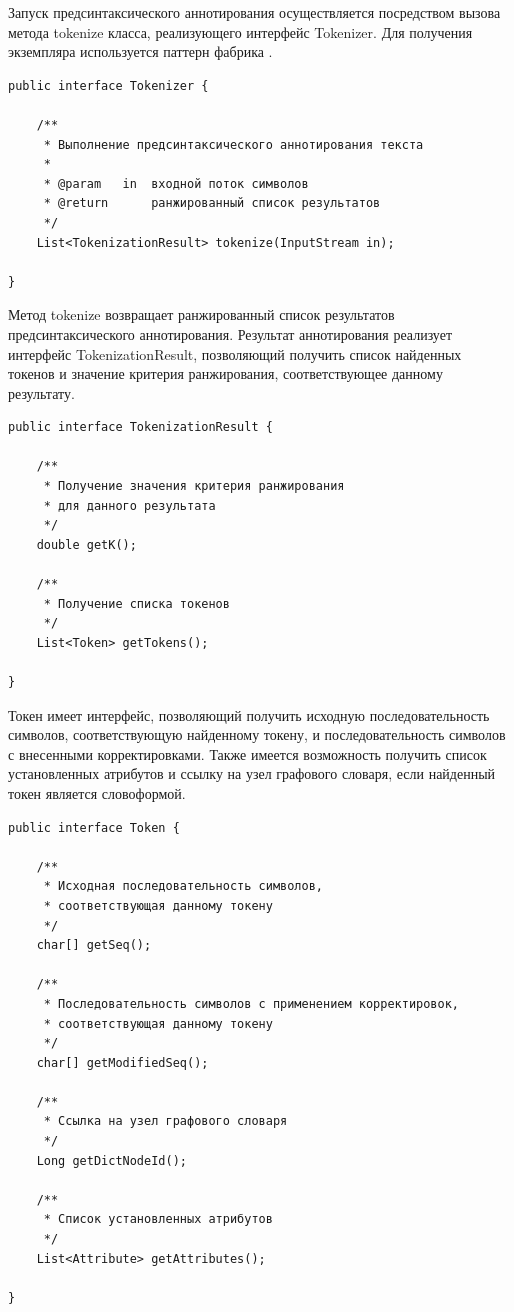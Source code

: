 Запуск предсинтаксического аннотирования осуществляется посредством вызова метода tokenize класса, реализующего интерфейс Tokenizer. Для получения экземпляра используется паттерн фабрика \cite{gof}.
\begin{lstlisting}[caption={Интерфейс модуля предсинтаксического аннотирования}]
public interface Tokenizer {

    /**
     * Выполнение предсинтаксического аннотирования текста
     *
     * @param   in  входной поток символов
     * @return      ранжированный список результатов
     */
    List<TokenizationResult> tokenize(InputStream in);

}
\end{lstlisting}
Метод tokenize возвращает ранжированный список результатов предсинтаксического аннотирования. Результат аннотирования реализует интерфейс TokenizationResult, позволяющий получить список найденных токенов и значение критерия ранжирования, соответствующее данному результату.
\begin{lstlisting}[caption={Интерфейс результата аннотирования}]
public interface TokenizationResult {

    /**
     * Получение значения критерия ранжирования 
     * для данного результата
     */
    double getK();

    /**
     * Получение списка токенов
     */
    List<Token> getTokens();

}
\end{lstlisting}
Токен имеет интерфейс, позволяющий получить исходную последовательность символов, соответствующую найденному токену, и последовательность символов с внесенными корректировками. Также имеется возможность получить список установленных атрибутов и ссылку на узел графового словаря, если найденный токен является словоформой.
\begin{lstlisting}[caption={Интерфейс токена}]
public interface Token {

    /**
     * Исходная последовательность символов,
     * соответствующая данному токену
     */
    char[] getSeq();

    /**
     * Последовательность символов с применением корректировок,
     * соответствующая данному токену
     */
    char[] getModifiedSeq();

    /**
     * Ссылка на узел графового словаря
     */
    Long getDictNodeId();

    /**
     * Список установленных атрибутов
     */
    List<Attribute> getAttributes();

}
\end{lstlisting}